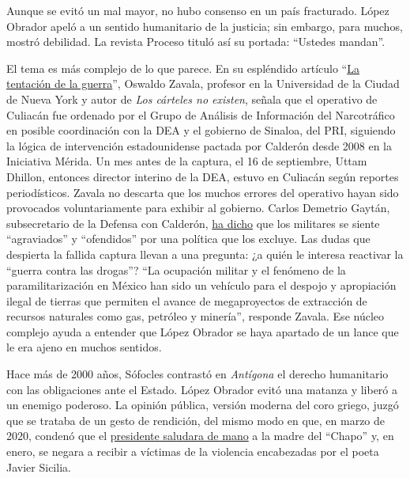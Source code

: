 Aunque se evitó un mal mayor, no hubo consenso en un país fracturado.
López Obrador apeló a un sentido humanitario de la justicia; sin
embargo, para muchos, mostró debilidad. La revista Proceso tituló así su
portada: ``Ustedes mandan''.

El tema es más complejo de lo que parece. En su espléndido artículo
``\href{https://perrocronico.com/la-tentacion-de-la-guerra/}{La
tentación de la guerra}'', Oswaldo Zavala, profesor en la Universidad de
la Ciudad de Nueva York y autor de \emph{Los cárteles no existen},
señala que el operativo de Culiacán fue ordenado por el Grupo de
Análisis de Información del Narcotráfico en posible coordinación con la
DEA y el gobierno de Sinaloa, del PRI, siguiendo la lógica de
intervención estadounidense pactada por Calderón desde 2008 en la
Iniciativa Mérida. Un mes antes de la captura, el 16 de septiembre,
Uttam Dhillon, entonces director interino de la DEA, estuvo en Culiacán
según reportes periodísticos. Zavala no descarta que los muchos errores
del operativo hayan sido provocados voluntariamente para exhibir al
gobierno. Carlos Demetrio Gaytán, subsecretario de la Defensa con
Calderón,
\href{https://aristeguinoticias.com/3010/mexico/cuestiona-general-decisiones-estrategicas-del-ejecutivo-que-no-han-convencido-a-todos/}{ha
dicho} que los militares se siente ``agraviados'' y ``ofendidos'' por
una política que los excluye. Las dudas que despierta la fallida captura
llevan a una pregunta: ¿a quién le interesa reactivar la ``guerra contra
las drogas''? ``La ocupación militar y el fenómeno de la
paramilitarización en México han sido un vehículo para el despojo y
apropiación ilegal de tierras que permiten el avance de megaproyectos de
extracción de recursos naturales como gas, petróleo y minería'',
responde Zavala. Ese núcleo complejo ayuda a entender que López Obrador
se haya apartado de un lance que le era ajeno en muchos sentidos.

Hace más de 2000 años, Sófocles contrastó en \emph{Antígona} el derecho
humanitario con las obligaciones ante el Estado. López Obrador evitó una
matanza y liberó a un enemigo poderoso. La opinión pública, versión
moderna del coro griego, juzgó que se trataba de un gesto de rendición,
del mismo modo en que, en marzo de 2020, condenó que el
\href{https://www.eluniversal.com.mx/nacion/politica/amlo-saluda-de-mano-mama-de-el-chapo-en-sinaloa}{presidente
saludara de mano} a la madre del ``Chapo'' y, en enero, se negara a
recibir a víctimas de la violencia encabezadas por el poeta Javier
Sicilia.

